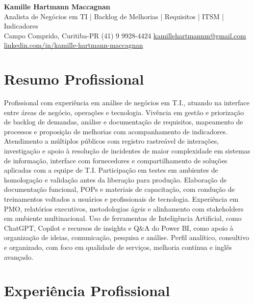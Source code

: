 \documentclass[11pt,a4paper]{article}
\newcommand{\cvheader}[4]{%
  \begin{center}
    {\LARGE\bfseries #1}\\[4pt]
    {\large #2}\\[6pt]
    #3\\[2pt]
    #4
  \end{center}
  \vspace{4pt}
}
\begin{document}
\cvheader{Kamille Hartmann Maccagnan}%
{Analista de Negócios em TI | Backlog de Melhorias | Requisitos | ITSM | Indicadores}%
{Campo Comprido, Curitiba-PR \textbullet{} (41) 9 9928-4424 \textbullet{} \href{mailto:kamillehartmannm@gmail.com}{kamillehartmannm@gmail.com}}%
{\href{https://linkedin.com/in/kamille-hartmann-maccagnan/}{linkedin.com/in/kamille-hartmann-maccagnan}}

\section*{Resumo Profissional}

Profissional com experiência em análise de negócios em T.I., atuando na interface entre áreas de negócio, operações e tecnologia. Vivência em gestão e priorização de backlog de demandas, análise e documentação de requisitos, mapeamento de processos e proposição de melhorias com acompanhamento de indicadores. Atendimento a múltiplos públicos com registro rastreável de interações, investigação e apoio à resolução de incidentes de maior complexidade em sistemas de informação, interface com fornecedores e compartilhamento de soluções aplicadas com a equipe de T.I. Participação em testes em ambientes de homologação e validação antes da liberação para produção. Elaboração de documentação funcional, POPs e materiais de capacitação, com condução de treinamentos voltados a usuários e profissionais de tecnologia. Experiência em PMO, relatórios executivos, metodologias ágeis e alinhamento com stakeholders em ambiente multinacional. Uso de ferramentas de Inteligência Artificial, como ChatGPT, Copilot e recursos de insights e Q\&A do Power BI, como apoio à organização de ideias, comunicação, pesquisa e análise. Perfil analítico, consultivo e organizado, com foco em qualidade de serviços, melhoria contínua e inglês avançado.

\section*{Experiência Profissional}
\end{document}
